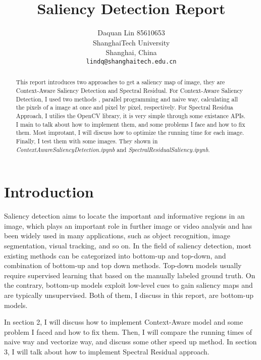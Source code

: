 \documentclass[10pt,twocolumn,letterpaper]{article}
\begin{document}
\title{Saliency Detection Report}

\author{Daquan Lin 85610653\\
ShanghaiTech University\\
Shanghai, China\\
{\tt\small lindq@shanghaitech.edu.cn}
}

\maketitle

\begin{abstract}
   This report introduces two approaches to get a saliency map of image, they are Context-Aware Saliency Detection\cite{goferman2012context} and Spectral Residual\cite{ou2007saliency}. For Context-Aware Saliency Detection, I used two methods , parallel programming and naive way, calculating all the pixels of a image at once and pixel by pixel, respectively. For Spectral Residua Approach, I utilies the OpenCV\cite{team2017opencv} library, it is very simple through some existance APIs. I main to talk about how to implement them, and some problems I face and how to fix them. Most improtant, I will discuss how to optimize the running time for each image. Finally, I test them with some images. They shown in \emph{ContextAwareSaliencyDetection.ipynb} and \emph{SpectralResidualSaliency.ipynb}.

\end{abstract}

\section{Introduction}

Saliency detection aims to locate the important and informative regions in an image, which plays an important role in further image or video analysis and has been widely used in many applications, such as object recognition, image segmentation, visual tracking, and so on. In the field of saliency detection, most existing methods can be categorized into bottom-up and top-down, and combination of bottom-up and top down methods. Top-down models usually require supervised learning that based on the manually labeled ground truth. On the contrary, bottom-up models exploit low-level cues to gain saliency maps and are typically unsupervised. Both of them, I discuss in this report, are bottom-up models.
\par In section 2, I will discuss how to implement Context-Aware model and some problem I faced and how to fix them. Then, I will compare the running times of naive way and vectorize way, and discuss some other speed up method. In section 3, I will talk about how to implement Spectral Residual approach.
\end{document}
